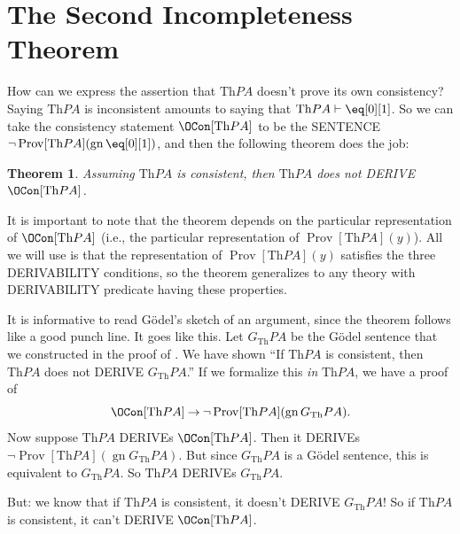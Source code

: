 \documentclass[10pt,a4paper]{article}
\makeatletter
\newcommand*{\olup}[1]{\MakeUppercase{#1}}
\theoremstyle{plain}
\newtheorem{thm}{Theorem}[section]
\theoremstyle{definition}
\theoremstyle{remark}
\newcommand*{\olfileid}[3]{}
\newcommand*{\olsection}[1]{\section*{#1}}
\newcommand*{\ollabel}[1]{\label{#1}}
\newcommand{\olref}{\@ifnextchar[{\olref@i}{\olref@final}}
\def\olref@i[#1]{\@ifnextchar[{\olref@ii}{\olref@final}}
\def\olref@ii[#1]{\@ifnextchar[{\olref@iii}{\olref@final}}
\def\olref@iii[#1]{\olref@final}
\def\olref@final#1{\ref{#1}}
\providecommand{\lif}{\mathbin{\rightarrow}}
\providecommand{\Proves}{\mathrel{\vdash}}
\providecommand{\Th}{\ensuremath{\mathrm{Th}}}
\providecommand{\Prov}{\operatorname{Prov}}
\providecommand{\gn}{\operatorname{gn}}
\providecommand{\OProv}{\operatorname{Prov}}
\makeatother
\begin{document}



\olfileid{inc}{inp}{2in}

\olsection{The Second Incompleteness Theorem}

How can we express the assertion that $\Th{PA}$ doesn't prove its own
consistency? Saying $\Th{PA}$ is inconsistent amounts to saying that
$\Th{PA} \Proves \eq[0][1]$. So we can take the consistency statement
$\OCon[\Th{PA}]$ to be the \olup{sentence} $\lnot
\OProv[\Th{PA}](\gn{\eq[0][1]})$, and then the following theorem does
the job:

\begin{thm}
\ollabel{thm:second-incompleteness} 
Assuming $\Th{PA}$ is consistent, then $\Th{PA}$ does not \olup{derive}
$\OCon[\Th{PA}]$.
\end{thm}

It is important to note that the theorem depends on the particular
representation of $\OCon[\Th{PA}]$ (i.e., the particular
representation of $\OProv[\Th{PA}](y)$). All we will use is that the
representation of $\OProv[\Th{PA}](y)$ satisfies the three
\olup{derivability} conditions, so the theorem generalizes to any theory
with \olup{derivability} predicate having these properties.

It is informative to read G\"odel's sketch of an argument, since the
theorem follows like a good punch line. It goes like this. Let
$G_\Th{PA}$ be the G\"odel sentence that we constructed in the proof
of \olref[1in]{thm:first-incompleteness}. We have shown ``If $\Th{PA}$
is consistent, then $\Th{PA}$ does not \olup{derive} $G_\Th{PA}$.'' If we
formalize this \emph{in} $\Th{PA}$, we have a proof of
\[
\OCon[\Th{PA}] \lif \lnot \OProv[\Th{PA}](\gn{G_\Th{PA}}).
\]
Now suppose $\Th{PA}$ \olup{derive}s $\OCon[\Th{PA}]$. Then it \olup{derive}s $\lnot
\Prov[\Th{PA}](\gn{G_\Th{PA}})$. But since $G_\Th{PA}$ is a G\"odel
sentence, this is equivalent to $G_\Th{PA}$. So $\Th{PA}$ \olup{derive}s
$G_\Th{PA}$.

But: we know that if $\Th{PA}$ is consistent, it doesn't \olup{derive}
$G_\Th{PA}$!{}  So if $\Th{PA}$ is consistent, it can't \olup{derive}
$\OCon[\Th{PA}]$.
\end{document}
